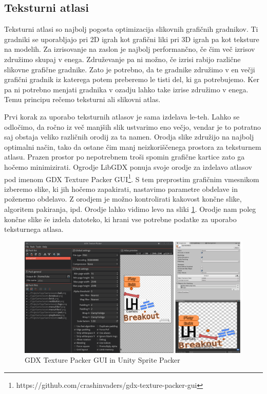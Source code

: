 \documentclass[12pt,a4paper,twoside]{book}
\begin{document}
\subsection{Teksturni atlasi}
Teksturni atlasi so najbolj pogosta optimizacija slikovnih grafičnih gradnikov. Ti gradniki se uporabljajo pri 2D igrah kot grafični liki pri 3D igrah pa kot teksture na modelih. Za izrisovanje na zaslon je najbolj performančno, če čim več izrisov združimo skupaj v enega. Združevanje pa ni možno, če izrisi rabijo različne slikovne grafične gradnike. Zato je potrebno, da te gradnike združimo v en večji grafični gradnik iz katerega potem preberemo le tisti del, ki ga potrebujemo. Ker pa ni potrebno menjati gradnika v ozadju lahko take izrise združimo v enega. Temu principu rečemo teksturni ali slikovni atlas.

Prvi korak za uporabo teksturnih atlasov je sama izdelava le-teh. Lahko se odločimo, da ročno iz več manjših slik ustvarimo eno večjo, vendar je to potratno saj obstaja veliko različnih orodij za ta namen. Orodja slike združijo na najbolj optimalni način, tako da ostane čim manj neizkoriščenega prostora za teksturnem atlasu. Prazen prostor po nepotrebnem troši spomin grafične kartice zato ga hočemo minimizirati. Ogrodje LibGDX ponuja svoje orodje za izdelavo atlasov pod imenom GDX Texture Packer GUI\footnote{https://github.com/crashinvaders/gdx-texture-packer-gui}. S tem preprostim grafičnim vmesnikom izberemo slike, ki jih hočemo zapakirati, nastavimo parametre obdelave in poženemo obdelavo. Z orodjem je možno kontrolirati kakovost končne slike, algoritem pakiranja, ipd. Orodje lahko vidimo levo na sliki \ref{slika:texturePacker}. Orodje nam poleg končne slike še izdela datoteko, ki hrani vse potrebne podatke za uporabo teksturnega atlasa.

\begin{figure}[h]
	\centering
	\includegraphics[width=15cm]{texturePacker}
	\caption{GDX Texture Packer GUI in Unity Sprite Packer}
	\label{slika:texturePacker}
\end{figure}
\end{document}

